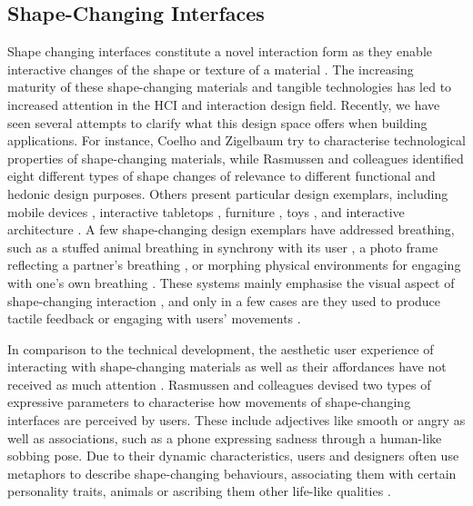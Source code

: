 \subsection{Shape-Changing Interfaces}

Shape changing interfaces constitute a novel interaction form as they enable interactive changes of the shape or texture of a material \cite{alexander_grand_2018}. The increasing maturity of these shape-changing materials and tangible technologies has led to increased attention in the HCI and interaction design field. Recently, we have seen several attempts to clarify what this design space offers when building applications. For instance, Coelho and Zigelbaum \cite{coelho_shape-changing_2011} try to characterise technological properties of shape-changing materials, while Rasmussen and colleagues \cite{rasmussen_shape-changing_2012} identified eight different types of shape changes of relevance to different functional and hedonic design purposes. Others present particular design exemplars, including mobile devices \cite{hemmert_shape-changing_2010, dimitriadis_evaluating_2014, gomes_morephone_2013}, interactive tabletops \cite{follmer_inform_2013, taher_exploring_2015}, furniture \cite{gronvall_causing_2014}, toys \cite{katsumoto_ninja_2013}, and interactive architecture \cite{oosterhuis_interactions_2008}. A few shape-changing design exemplars have addressed breathing, such as a stuffed animal breathing in synchrony with its user \cite{aslan_hold_2016}, a photo frame  reflecting a partner's breathing \cite{kim_breathingframe_2015}, or morphing physical environments for engaging with one's own breathing \cite{sjoman_breathing_2018, schnadelbach_exobuilding:_2012}. These systems mainly emphasise the visual aspect of shape-changing interaction \cite{kim_breathingframe_2015, sjoman_breathing_2018, schnadelbach_exobuilding:_2012, moran_exopranayama:_2016}, and only in a few cases are they used to produce tactile feedback \cite{yu_breathe_2015} or engaging with users' movements \cite{tomimatsu_2016}.

In comparison to the technical development, the aesthetic user experience of interacting with shape-changing materials as well as their affordances have not received as much attention \cite{rasmussen_shape-changing_2012, alexander_grand_2018}. Rasmussen and colleagues \cite{rasmussen_shape-changing_2012} devised two types of expressive parameters to characterise how movements of shape-changing interfaces are perceived by users. These include adjectives like smooth or angry as well as associations, such as a phone expressing sadness through a human-like sobbing pose. Due to their dynamic characteristics, users and designers often use metaphors to describe shape-changing behaviours, associating them with certain personality traits, animals or ascribing them other life-like qualities \cite{rasmussen_sketching_2016, kwak_design_2014}.


